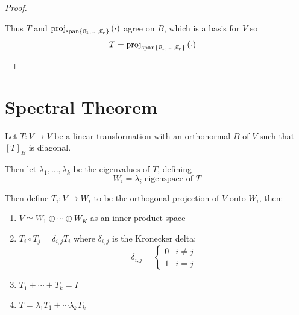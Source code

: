 \begin{proof}
\begin{itemize}
      Thus $T$ and $\proj[\spanof{\vec v_1,\ldots,\vec v_r}]{\cdot}$ agree on $B$, which is a basis for $V$ so
        \begin{align}
          T &= \proj[\spanof{\vec v_1,\ldots,\vec v_r}]{\cdot}
          \end{align}
  \end{itemize}
\end{proof}

\section{Spectral Theorem}
\begin{theorem}
  Let $T : V \to V$ be a linear transformation with an orthonormal $B$ of $V$
  such that $[T]_B$ is diagonal.

  Then let $\lambda_1,\ldots,\lambda_k$ be the eigenvalues of $T$, defining
    $$W_i = \lambda_i\text{-eigenspace of }T$$

  Then define $T_i : V \to W_i$ to be the orthogonal projection of $V$ onto $W_i$, then:
  \begin{enumerate}[(1)]
    \item $V \simeq W_1 \oplus \cdots \oplus W_K$ as an inner product space
    \item $T_i \circ T_j = \delta_{i,j}T_i$ where $\delta_{i,j}$ is the Kronecker delta:
      $$\delta_{i,j} = \begin{cases}
        0 & i \ne j \\
        1 & i = j
      \end{cases}$$
    \item $T_1 + \cdots + T_k = I$
    \item $T = \lambda_1T_1 + \cdots \lambda_k T_k$
  \end{enumerate}
\end{theorem}
